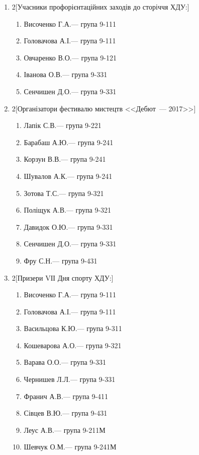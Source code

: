 \documentclass[
	a4paper,
	12pt,
	oneside,
	draft
]{extreport}
\begin{document}
{\begin{enumerate}[label=\Roman*.]
\item \begin{multicols}{2}[Учасники профорієнтаційних заходів до сторіччя ХДУ:]
\begin{enumerate}[topsep=0pt,itemsep=-1ex,partopsep=1ex,parsep=1ex,label=\arabic*.]
\item Височенко Г.А.\hfill --- група 9-111
\item Головачова А.І.\hfill --- група 9-111
\item Овчаренко В.О.\hfill --- група 9-121
\item Іванова О.В.\hfill --- група 9-331
\item Сенчишен Д.О.\hfill --- група 9-331
\end{enumerate}
\end{multicols}


\item \begin{multicols}{2}[Організатори фестивалю мистецтв <<Дебют~--- 2017>>]
\begin{enumerate}[topsep=0pt,itemsep=-1ex,partopsep=1ex,parsep=1ex,label=\arabic*.]
\item Лапік С.В.\hfill --- група 9-221
\item Барабаш А.Ю.\hfill --- група 9-241
\item Корзун В.В.\hfill --- група 9-241
\item Шувалов А.К.\hfill --- група 9-241
\item Зотова Т.С.\hfill --- група 9-321
\item Поліщук А.В.\hfill --- група 9-321
\item Давидок О.Ю.\hfill --- група 9-331
\item Сенчишен Д.О.\hfill --- група 9-331
\item Фру С.Н.\hfill --- група 9-431
\end{enumerate}
\end{multicols}


\newpage\item \begin{multicols}{2}[Призери VІІ Дня спорту ХДУ:]
\begin{enumerate}[topsep=0pt,itemsep=-1ex,partopsep=1ex,parsep=1ex,label=\arabic*.]
\item Височенко Г.А.\hfill --- група 9-111
\item Головачова А.І.\hfill --- група 9-111
\item Васильцова К.Ю.\hfill --- група 9-311
\item Кошеварова А.О.\hfill --- група 9-321
\item Варава О.О.\hfill --- група 9-331
\item Чернишев Л.Л.\hfill --- група 9-331
\item Франич А.В.\hfill --- група 9-411
\item Сівцев В.Ю.\hfill --- група 9-431
\item Леус А.В.\hfill --- група 9-211М
\item Шевчук О.М.\hfill --- група 9-241М
\end{enumerate}
\end{multicols}



\end{enumerate}}
\end{document}
